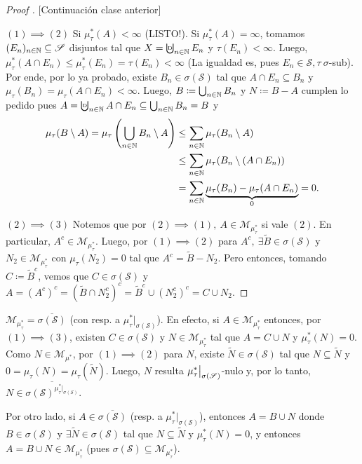 \medskip
\begin{proof}[Proof ][Continuación clase anterior]
	\text{} \par
	$\boxed{(1) \implies (2)}$ Si $\mu_{\tau}^{*}(A) < \infty$ (LISTO!). Si $\mu_{\tau}^{*}(A) = \infty$, tomamos $(E_n)_{n\in\mathbb{N}} \subseteq \mathscr{S}$ disjuntos tal que $X = \textbigcupd_{n\in\N} E_n$ y $\tau(E_n) < \infty$. Luego, $\mu_{\tau}^{*}(A \cap E_n) \leq \mu_{\tau}^{*} (E_n) = \tau(E_n) < \infty$ (La igualdad es, pues $E_n \in \mathscr{S}, \tau \ \sigma$-sub). Por ende, por lo ya probado, existe $B_n \in \sigma(\mathscr{S})$ tal que $A \cap E_n \subseteq B_n$ y $\mu_{\tau}(B_n) = \mu_{\tau}(A \cap E_n) < \infty$. Luego, $B \coloneq \bigcup_{n\in\mathbb{N}} B_n$ y $N \coloneq B-A$ cumplen lo pedido pues $A = \textbigcupd_{n\in\N} A \cap E_n \subseteq \bigcup_{n\in\N} B_n = B$ y
	\begin{align*}
		\mu_{\tau}(B\setminus A) = \mu_{\tau}\left( \bigcup_{n\in\mathbb{N}} B_n \setminus A \right) & \leq \sum_{n\in\mathbb{N}} \mu_{\tau}(B_n \setminus A) \\
		& \leq \sum_{n\in\mathbb{N}} \mu_{\tau}(B_n \setminus (A \cap E_n)) \\
		&= \sum_{n\in\mathbb{N}} \underbrace{\mu_{\tau}(B_n) - \mu_{\tau}(A \cap E_n)}_{0} = 0 
	.\end{align*}

	$\boxed{(2) \implies (3)}$ Notemos que por $(2) \implies (1),\ A \in \mathscr{M}_{\mu_{\tau}^{*}}$ si vale $(2)$. En particular, $A^c \in \mathscr{M}_{\mu_{\tau}^{*}}$. Luego, por $(1) \implies (2)$ para $A^c,\ \exists \widetilde{B} \in \sigma(\mathscr{S})$ y $N_2 \in \mathscr{M}_{\mu_{\tau}^{*}}$ con $\mu_{\tau}(N_{2}) = 0$ tal que $A^c = \widetilde{B} - N_{2}$. Pero entonces, tomando $C \coloneq \widetilde{B}^c$, vemos que $C \in \sigma(\mathscr{S})$ y $A = (A^c)^c = (\widetilde{B} \cap N_{2}^c)^c = \widetilde{B}^c \cup (N_{2}^c)^c = C \cup N_2$.
\end{proof}
\medskip
\begin{remark}
	$\mathscr{M}_{\mu_{\tau}^{*}} = \overline{\sigma(\mathscr{S})}$ (con resp. a $\mu_{\tau}^{*}|_{\sigma(\mathscr{S})}$). En efecto, si $A \in \mathscr{M}_{\mu_{\tau}^{*}}$ entonces, por $(1) \implies (3)$, existen $C \in \sigma(\mathscr{S})$ y $N \in \mathscr{M}_{\mu_{\tau}^{*}}$ tal que $A = C \cup N$ y $\mu_{\tau}^{*}(N) = 0$. Como $N \in \mathscr{M}_{\mu^{*}}$, por $(1) \implies (2)$ para $N$, existe $\widetilde{N} \in \sigma(\mathscr{S})$ tal que $N \subseteq \widetilde{N}$ y $0 = \mu_{\tau}(N) = \mu_{\tau}(\widetilde{N})$. Luego, $N$ resulta $\mu_{\tau}^{*}\big{|}_{\sigma(\mathscr{S})}$-nulo y, por lo tanto, $N \in \overline{\sigma(\mathscr{S})^{\mu_{\tau}^{*}|_{\sigma(\mathscr{S})}}}$. \par
	
	Por otro lado, si $A \in \overline{\sigma(\mathscr{S})}$ (resp. a $\mu_{\tau}^{*}|_{\sigma(\mathscr{S})}$), entonces $A = B \cup N$ donde $B \in \sigma(\mathscr{S})$ y $\exists \widetilde{N} \in \sigma(\mathscr{S})$ tal que $N \subseteq \widetilde{N}$ y $\mu_{\tau}^{*}(N) = 0$, y entonces $A = B \cup N \in \mathscr{M}_{\mu_{\tau}^{*}}$ (pues $\sigma(\mathscr{S}) \subseteq \mathscr{M}_{\mu_{\tau}^{*}}$).
\end{remark}
